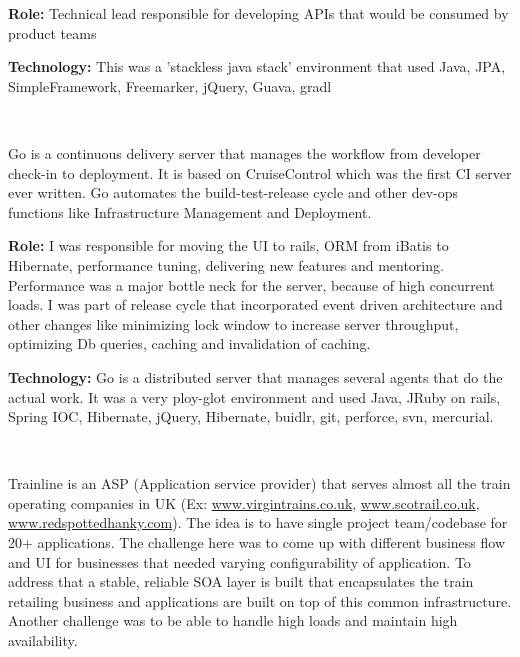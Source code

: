 \begin{resume}
\begin{position}
{\textbf{Role:}} Technical lead responsible for developing APIs that would be consumed by product teams

{\textbf{Technology:}} This was a 'stackless java stack' environment that used Java, JPA, SimpleFramework, Freemarker, jQuery, Guava, gradl
\end{position}\\

\begin{position}
Go is a continuous delivery server that manages the workflow from developer check-in to deployment. It is based on CruiseControl which was the first CI server ever written. Go automates the build-test-release cycle and other dev-ops functions like Infrastructure Management and Deployment.

{\textbf{Role:}} I was responsible for moving the UI to rails, ORM from iBatis to Hibernate, performance tuning, delivering new features and mentoring. Performance was a major bottle neck for the server, because of high concurrent loads. I was part of release cycle that incorporated event driven architecture and other changes like minimizing lock window to increase server throughput, optimizing Db queries, caching and invalidation of caching. 

{\textbf{Technology:}} Go is a distributed server that manages several agents that do the actual work. It was a very ploy-glot environment and used Java, JRuby on rails, Spring IOC, Hibernate, jQuery, Hibernate, buidlr, git, perforce, svn, mercurial.
\end{position}\\

\begin{position}
Trainline is an ASP (Application service provider) that serves almost all the train operating companies in UK (Ex: \url{www.virgintrains.co.uk}, \url{www.scotrail.co.uk}, \url{www.redspottedhanky.com}). The idea is to have single project team/codebase for 20+ applications. The challenge here was to come up with different business flow and UI for businesses that needed varying configurability of application. To address that a stable, reliable SOA layer is built that encapsulates the train retailing business and applications are built on top of this common infrastructure. Another challenge was to be able to handle high loads and maintain high availability.


\end{position}
\end{resume}
